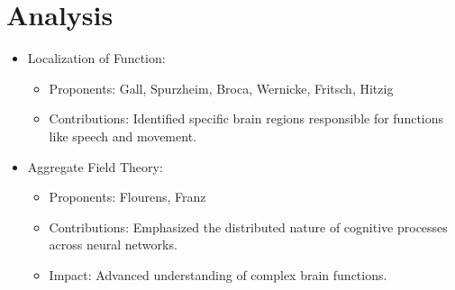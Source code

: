 \section{Analysis}
\begin{itemize}
    \item Localization of Function:
    \begin{itemize}
        \item Proponents: Gall, Spurzheim, Broca, Wernicke, Fritsch, Hitzig
        \item Contributions: Identified specific brain regions responsible for functions like speech and movement.
    \end{itemize}

    
    \item Aggregate Field Theory:
\begin{itemize}
    \item Proponents: Flourens, Franz
    \item Contributions: Emphasized the distributed nature of cognitive processes across neural networks.
    \item Impact: Advanced understanding of complex brain functions.
\end{itemize}
\end{itemize}

